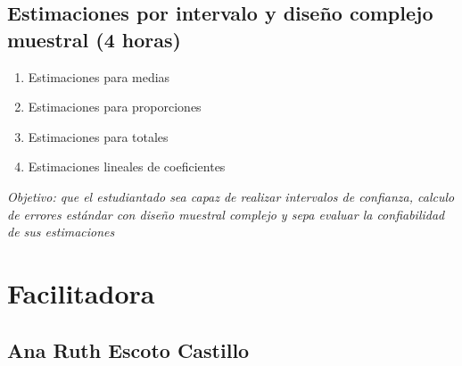 \documentclass[
  letterpaper,
  DIV=11,
  numbers=noendperiod]{scrreprt}
\begin{document}
\hypertarget{estimaciones-por-intervalo-y-diseuxf1o-complejo-muestral-4-horas}{%
\section*{Estimaciones por intervalo y diseño complejo muestral (4
horas)}\label{estimaciones-por-intervalo-y-diseuxf1o-complejo-muestral-4-horas}}


\begin{enumerate}
\def\labelenumi{\alph{enumi}.}
\item
  Estimaciones para medias
\item
  Estimaciones para proporciones
\item
  Estimaciones para totales
\item
  Estimaciones lineales de coeficientes
\end{enumerate}

\emph{Objetivo: que el estudiantado sea capaz de realizar intervalos de
confianza, calculo de errores estándar con diseño muestral complejo y
sepa evaluar la confiabilidad de sus estimaciones}


\hypertarget{facilitadora}{%
\chapter*{Facilitadora}\label{facilitadora}}


\hypertarget{ana-ruth-escoto-castillo}{%
\section*{Ana Ruth Escoto Castillo}\label{ana-ruth-escoto-castillo}}

\end{document}
